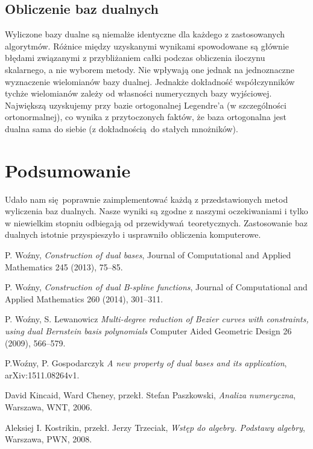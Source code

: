 \documentclass{article}
\begin{document}
\subsection{Obliczenie baz dualnych}

Wyliczone bazy dualne są niemalże identyczne dla każdego z zastosowanych algorytmów. 
Różnice między uzyskanymi wynikami spowodowane są głównie błędami związanymi z przybliżaniem całki podczas obliczenia iloczynu skalarnego, a nie wyborem metody. Nie wpływają one jednak na jednoznaczne wyznaczenie wielomianów bazy dualnej. Jednakże dokładność współczynników tychże wielomianów zależy od własności numerycznych bazy wyjściowej. Największą uzyskujemy przy bazie ortogonalnej Legendre'a (w szczególności ortonormalnej), co wynika z przytoczonych faktów, że baza ortogonalna jest dualna sama do siebie (z dokładnością do stałych mnożników).

\section*{Podsumowanie}

Udało nam się poprawnie zaimplementować każdą z przedstawionych metod wyliczenia baz dualnych. Nasze wyniki są zgodne z naszymi oczekiwaniami i tylko w niewielkim stopniu odbiegają od przewidywań teoretycznych. Zastosowanie baz dualnych istotnie przyspieszyło i usprawniło obliczenia komputerowe. 

\begin{thebibliography}{99}

 P. Woźny,
\emph{Construction of dual bases},
Journal of Computational and Applied Mathematics 245 (2013), 75–85.

 P. Woźny,
\emph{Construction of dual B-spline functions},
Journal of Computational and Applied Mathematics 260 (2014), 301–311.

 P. Woźny, S. Lewanowicz
\emph{Multi-degree reduction of Bezier curves with constraints, using dual Bernstein basis polynomials}
Computer Aided Geometric Design 26 (2009), 566–579.

 P.Woźny, P. Gospodarczyk
\emph{A new property of dual bases and its application},
arXiv:1511.08264v1.

 David Kincaid, Ward Cheney, przekł. Stefan Paszkowski,
\emph{Analiza numeryczna},
Warszawa, WNT, 2006.

 Aleksiej I. Kostrikin, przekł. Jerzy Trzeciak,
\emph{Wstęp do algebry. Podstawy algebry},
Warszawa, PWN, 2008.

\end{thebibliography}
\end{document}
